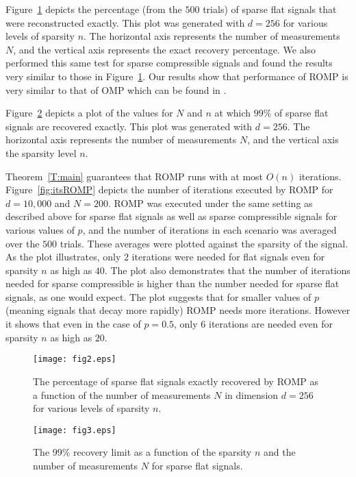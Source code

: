 \documentclass[12pt]{amsart}
\theoremstyle{plain}
\theoremstyle{definition}
\theoremstyle{remark}
\numberwithin{equation}{section}
\begin{document}
Figure~\ref{fig:percent} depicts the percentage (from the $500$ trials) of sparse flat signals that were 
reconstructed exactly. This plot was generated with $d = 256$ for various levels of sparsity $n$. The horizontal axis represents the number of measurements $N$, and the vertical
axis represents the exact recovery percentage. We also performed this same test for sparse compressible signals and found the results very similar to those in Figure~\ref{fig:percent}.
Our results show that performance of ROMP is very similar to that of OMP which can be found in \cite{TG}. 

Figure~\ref{fig:99} depicts a plot of the values for $N$ and $n$ at which $99\%$ of sparse flat signals are recovered exactly. This plot was generated with $d=256$. The horizontal axis represents the number of measurements $N$, and the vertical axis the sparsity level $n$. 

Theorem~\ref{T:main} guarantees that ROMP runs with at most $O(n)$ iterations. Figure~\ref{fig:itsROMP} depicts the number of iterations executed by ROMP for $d=10,000$ and $N=200$. ROMP was 
executed under the same setting as described above for sparse flat signals as well as sparse compressible signals for various values of $p$, and the number of iterations
in each scenario was averaged over the $500$ trials. These averages were plotted against
the sparsity of the signal. As the plot illustrates, only $2$
iterations were needed for flat signals even for sparsity $n$ as high as $40$. The plot also demonstrates that the number of iterations needed for sparse compressible
is higher than the number needed for sparse flat signals, as one would expect. The plot suggests that for smaller
values of $p$ (meaning signals that decay more rapidly) ROMP needs more iterations. However it shows that even in the case of $p=0.5$, only $6$ iterations are needed even for sparsity $n$ as high as $20$.   

\begin{figure}[ht] 
  \texttt{[image: fig2.eps]}
  \caption{The percentage of sparse flat signals exactly recovered by ROMP as a function of the number of measurements $N$ in dimension $d=256$ for various levels of sparsity $n$.}\label{fig:percent}
\end{figure}

\begin{figure}[ht] 
  \texttt{[image: fig3.eps]}
  \caption{The $99\%$ recovery limit as a function of the sparsity $n$ and the number of measurements $N$ for sparse flat signals.}\label{fig:99}
\end{figure}
\end{document}
